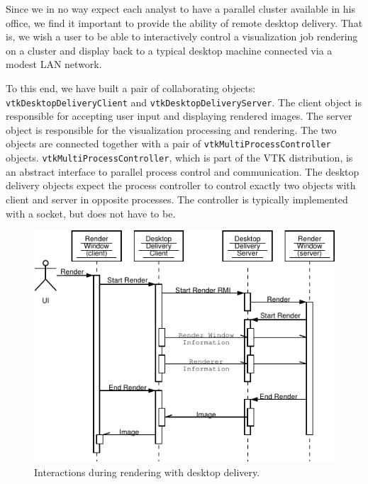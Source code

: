 \documentclass[twocolumn]{article}
\newcommand{\cidentifier}[1]{\texttt{#1}}
\begin{document}
  Since we in no way expect each analyst to have a parallel cluster
  available in his office, we find it important to provide the ability of
  remote desktop delivery.  That is, we wish a user to be able to
  interactively control a visualization job rendering on a cluster and
  display back to a typical desktop machine connected via a modest LAN
  network.

  To this end, we have built a pair of collaborating objects:
  \cidentifier{vtk\-Desktop\-Delivery\-Client} and
  \cidentifier{vtk\-Desktop\-Delivery\-Server}.  The client object is
  responsible for accepting user input and displaying rendered images.  The
  server object is responsible for the visualization processing and
  rendering.  The two objects are connected together with a pair of
  \cidentifier{vtk\-Multi\-Process\-Controller} objects.
  \cidentifier{vtk\-Multi\-Process\-Controller}, which is part of the VTK
  distribution, is an abstract interface to parallel process control and
  communication.  The desktop delivery objects expect the process
  controller to control exactly two objects with client and server in
  opposite processes.  The controller is typically implemented with a
  socket, but does not have to be.

  \begin{figure}[ht]
    \begin{center}
      \includegraphics[width=\linewidth]{images/DesktopDeliveryInteraction}
      \caption{Interactions during rendering with desktop delivery.}
      \label{fig:desktop_delivery_interaction}
    \end{center}
  \end{figure}
\end{document}
